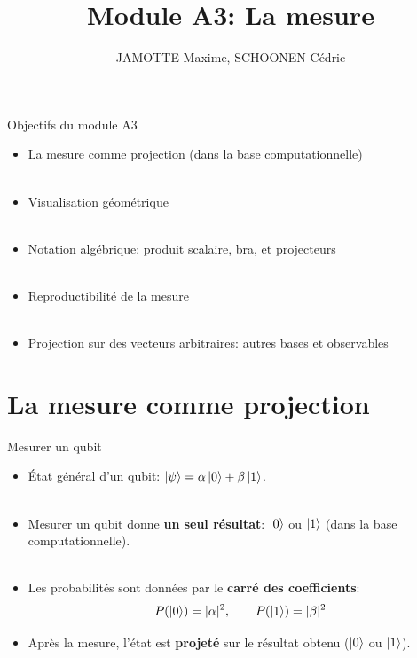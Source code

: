 \documentclass[aspectratio=169,12pt]{beamer}
\title[Module A3]{Module A3: La mesure}
\author{JAMOTTE Maxime, SCHOONEN Cédric}
\institute{Digital Learning Hub}
\date{}
\begin{document}
\begin{frame}
  \titlepage
\end{frame}

\begin{frame}{Objectifs du module A3}
    \begin{itemize}
        \item La mesure comme projection (dans la base computationnelle)\\~\\
        \item Visualisation géométrique\\~\\
        \item Notation algébrique: produit scalaire, bra, et projecteurs\\~\\
        \item Reproductibilité de la mesure\\~\\
        \item Projection sur des vecteurs arbitraires: autres bases et observables
    \end{itemize}
\end{frame}

\section{La mesure comme projection}

\begin{frame}{Mesurer un qubit}
  \begin{itemize}[<+->]
    \setlength{\itemsep}{0.6em}
    \item État général d'un qubit: $\ket{\psi} = \alpha \ket 0 + \beta \ket 1$.
    \\~\\
    \item Mesurer un qubit donne \textbf{un seul résultat}: $\ket{0}$ ou $\ket{1}$ (dans la base computationnelle).
    \\~\\
    \item Les probabilités sont données par le \textbf{carré des coefficients}:
    $$P(\ket 0) = |\alpha|^2, \qquad P(\ket 1) = |\beta|^2$$
    \item Après la mesure, l'état est \textbf{projeté} sur le résultat obtenu ($\ket{0}$ ou $\ket{1}$).
  \end{itemize}
\end{frame}
\end{document}
